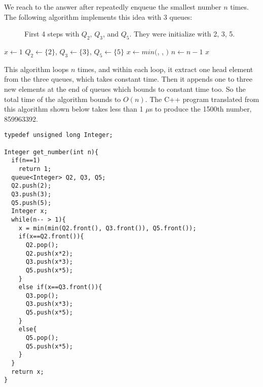 \documentclass[b5paper]{article}
\begin{document}
We reach to the answer after repeatedly enqueue the smallest number $n$ times. The following algorithm implements this idea with 3 queues:

\begin{figure}[htbp]
  \centering
  \caption{First 4 steps with $Q_2$, $Q_3$, and $Q_5$. They were initialize with 2, 3, 5.}
  \label{fig:q235}
\end{figure}

\begin{algorithmic}[1]
  \State $x \gets 1$
  \State $Q_2 \gets \{ 2 \}$, $Q_3 \gets \{ 3 \}$, $Q_5 \gets \{ 5 \}$
    \State $x \gets min($, , $)$
      \State {}
      \State {}
      \State {}
      \State {}
      \State {}
      \State {}
      \State {}
    \Else
      \State {}
      \State {}
    \EndIf
    \State $n \gets n - 1$
  \EndWhile
  \State \Return $x$
\EndFunction
\end{algorithmic}

This algorithm loops $n$ times, and within each loop, it extract one head
element from the three queues, which takes constant time. Then it appends
one to three new elements at the end of queues which bounds to constant time
too. So the total time of the algorithm bounds to $O(n)$. The C++ program
translated from this algorithm shown below takes less than 1 $\mu$s to
produce the 1500th number, 859963392.

\lstset{language=C++}
\begin{lstlisting}
typedef unsigned long Integer;

Integer get_number(int n){
  if(n==1)
    return 1;
  queue<Integer> Q2, Q3, Q5;
  Q2.push(2);
  Q3.push(3);
  Q5.push(5);
  Integer x;
  while(n-- > 1){
    x = min(min(Q2.front(), Q3.front()), Q5.front());
    if(x==Q2.front()){
      Q2.pop();
      Q2.push(x*2);
      Q3.push(x*3);
      Q5.push(x*5);
    }
    else if(x==Q3.front()){
      Q3.pop();
      Q3.push(x*3);
      Q5.push(x*5);
    }
    else{
      Q5.pop();
      Q5.push(x*5);
    }
  }
  return x;
}
\end{lstlisting}
\end{document}
